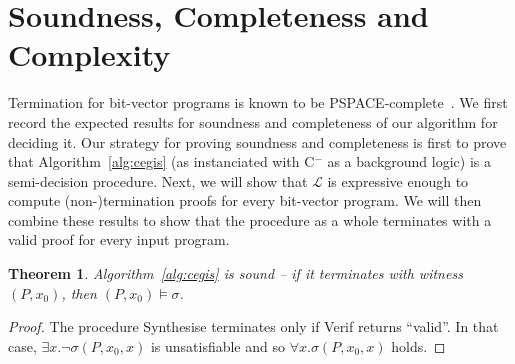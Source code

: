 \documentclass[preprint]{sigplanconf}
\newtheorem{theorem}{Theorem}
\theoremstyle{definition}
\newcommand{\newC}{C$^-$\xspace}
\begin{document}


\section{Soundness, Completeness and Complexity}

Termination for bit-vector programs is known to be
PSPACE-complete~\cite{DBLP:conf/tacas/CookKRW10}.  We first record the
expected results for soundness and completeness of our algorithm for
deciding it.  Our strategy for proving soundness and completeness
is first to prove that Algorithm~\ref{alg:cegis} (as instanciated
with \newC as a background logic) is a semi-decision
procedure.  Next, we will show that $\mathcal{L}$ is expressive enough
to compute (non-)termination proofs for every bit-vector program.
We will then combine these results to show that the procedure as a whole
terminates with a valid proof for every input program.
%
\begin{theorem}\label{thm:synth-sound}
Algorithm~\ref{alg:cegis} is sound -- if it terminates with witness $(P, x_0)$, then
$(P, x_0) \models \sigma$.
\end{theorem}

\begin{proof}
 The procedure {\sc Synthesise} terminates only if {\sc Verif} returns ``valid''.  In that
 case, $\exists x . \lnot \sigma(P, x_0, x)$ is unsatisfiable and so $\forall x . \sigma(P, x_0, x)$ holds.
\end{proof}
\end{document}
